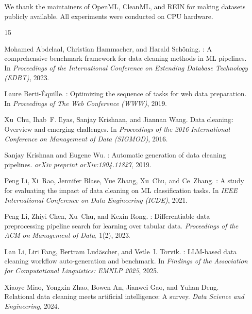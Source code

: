 \documentclass[preprint]{article}
\begin{document}
We thank the maintainers of OpenML, CleanML, and REIN for making datasets publicly available. All experiments were conducted on CPU hardware.



\begin{thebibliography}{15}

Mohamed Abdelaal, Christian Hammacher, and Harald Sch{\"o}ning.
: A comprehensive benchmark framework for data cleaning methods
  in {ML} pipelines.
\newblock In \emph{Proceedings of the International Conference on Extending
  Database Technology (EDBT)}, 2023.

Laure Berti-{\'E}quille.
: Optimizing the sequence of tasks for web data
  preparation.
\newblock In \emph{Proceedings of The Web Conference (WWW)}, 2019.

Xu~Chu, Ihab~F. Ilyas, Sanjay Krishnan, and Jiannan Wang.
\newblock Data cleaning: Overview and emerging challenges.
\newblock In \emph{Proceedings of the 2016 International Conference on
  Management of Data (SIGMOD)}, 2016.

Sanjay Krishnan and Eugene Wu.
: Automatic generation of data cleaning pipelines.
\newblock \emph{arXiv preprint arXiv:1904.11827}, 2019.

Peng Li, Xi~Rao, Jennifer Blase, Yue Zhang, Xu~Chu, and Ce~Zhang.
: A study for evaluating the impact of data cleaning on {ML}
  classification tasks.
\newblock In \emph{IEEE International Conference on Data Engineering (ICDE)},
  2021.

Peng Li, Zhiyi Chen, Xu~Chu, and Kexin Rong.
: Differentiable data preprocessing pipeline search for
  learning over tabular data.
\newblock \emph{Proceedings of the ACM on Management of Data}, 1(2), 2023.

Lan Li, Liri Fang, Bertram Lud{\"a}scher, and Vetle~I. Torvik.
: {LLM}-based data cleaning workflow auto-generation
  and benchmark.
\newblock In \emph{Findings of the Association for Computational Linguistics:
  EMNLP 2025}, 2025.

Xiaoye Miao, Yongxin Zhao, Bowen An, Jianwei Gao, and Yuhan Deng.
\newblock Relational data cleaning meets artificial intelligence: A survey.
\newblock \emph{Data Science and Engineering}, 2024.


\end{thebibliography}
\end{document}
